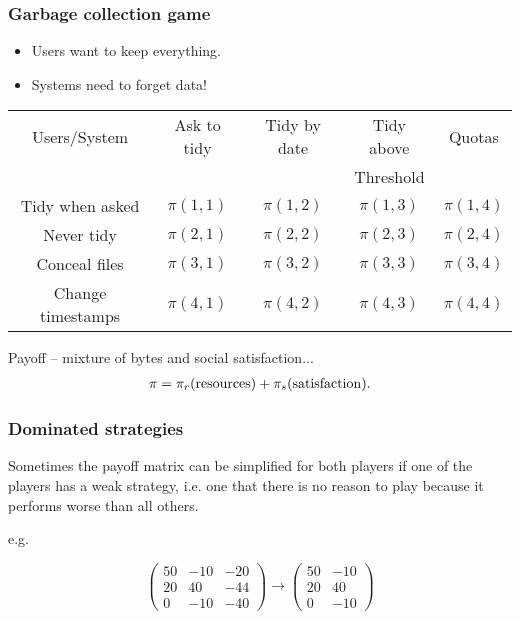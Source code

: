 \documentclass{beamer}
\begin{document}
\begin{frame}
\frametitle{Garbage collection game}
\begin{itemize}
\item Users want to keep everything. 
\item Systems need to forget data!
\end{itemize}


\begin{center}
\small
\begin{tabular}{|c|c|c|c|c|}
\hline
Users/System & Ask to tidy & Tidy by date & Tidy above & Quotas\\
             &             &              & Threshold  &       \\
\hline
Tidy when asked & $\pi(1,1)$ & $\pi(1,2)$ & $\pi(1,3)$ & $\pi(1,4)$\\
\hline
Never tidy & $\pi(2,1)$ & $\pi(2,2)$ & $\pi(2,3)$ & $\pi(2,4)$\\
\hline
Conceal files & $\pi(3,1)$ & $\pi(3,2)$ & $\pi(3,3)$ & $\pi(3,4)$\\
\hline
Change timestamps & $\pi(4,1)$ & $\pi(4,2)$ & $\pi(4,3)$ & $\pi(4,4)$\\
\hline
\end{tabular}
\end{center}

Payoff -- mixture of bytes and social satisfaction...
\begin{eqnarray}
\pi = \pi_r({\rm resources}) + \pi_s({\rm satisfaction}).
\end{eqnarray}


\end{frame}



\begin{frame}
\frametitle{Dominated strategies}

Sometimes the payoff matrix can be simplified 
for both players if one
of the players has a weak strategy, i.e. one that there is no reason to play
because it performs worse than all others.

e.g.

$$
\left(
\begin{array}{ccc}
50 & -10 & -20\\
20 & 40 & -44\\
0 & -10 & -40
\end{array}
\right)
\rightarrow
\left(
\begin{array}{cc}
50 & -10 \\
20 & 40 \\
0 & -10 
\end{array}
\right)
$$
\end{frame}
\end{document}

